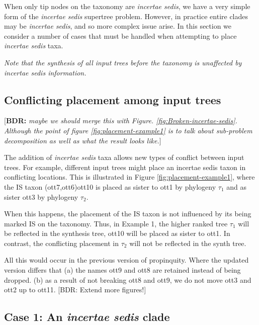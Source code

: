 \documentclass[english]{article}
\begin{document}
When only tip nodes on the taxonomy are \emph{incertae sedis}, we have
a very simple form of the \emph{incertae sedis} supertree problem.
However, in practice entire clades may be \emph{incertae sedis}, and
so more complex issue arise.
In this section we consider a number of
cases that must be handled when attempting to place \emph{incertae
sedis} taxa.

\emph{Note that the synthesis of all input trees before the taxonomy
is unaffected by incertae sedis information.}

\subsection{Conflicting placement among input trees}

{[}\textbf{BDR:} \emph{maybe we should merge this with Figure.
\ref{fig:Broken-incertae-sedis}.
Although the point of figure
\ref{fig:placement-example1} is to talk about sub-problem
decomposition as well as what the result looks like.}{]}

The addition of \emph{incertae sedis} taxa allows new types of
conflict between input trees.
For example, different input trees might
place an incertae sedis taxon in conflicting locations.
This is
illustrated in Figure \ref{fig:placement-example1}, where the IS
taxon (ott7,ott6)ott10 is placed as sister to ott1 by phylogeny
$\tau_{1}$ and as sister ott3 by phylogeny $\tau_{2}$.

When this happens, the placement of the IS taxon is not influenced by
its being marked IS on the taxonomy.
Thus, in Example 1, the higher
ranked tree $\tau_{1}$ will be reflected in the synthesis tree, ott10
will be placed as sister to ott1.
In contrast, the conflicting
placement in $\tau_{2}$ will not be reflected in the synth tree.

All this would occur in the previous version of propinquity.
Where the
updated version differs that (a) the names ott9 and ott8 are retained
instead of being dropped.
(b) as a result of not breaking ott8 and
ott9, we do not move ott3 and ott2 up to ott11.
{[}BDR: Extend more figures!{]}

\subsection{Case 1: An \emph{incertae sedis} clade}
\end{document}
